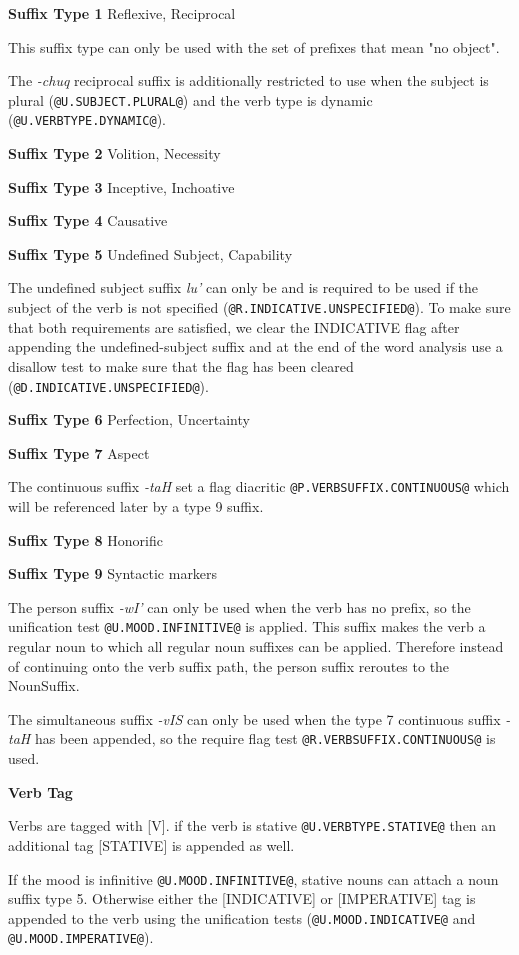 \documentclass[11pt]{article}
\begin{document}
\textbf{Suffix Type 1} Reflexive, Reciprocal
	
This suffix type can only be used with the set of prefixes that mean "no object".

The \textit{-chuq} reciprocal suffix is additionally restricted to use when the subject is plural (\texttt{@U.SUBJECT.PLURAL@}) and the verb type is dynamic (\texttt{@U.VERBTYPE.DYNAMIC@}).

\textbf{Suffix Type 2} Volition, Necessity

\textbf{Suffix Type 3} Inceptive, Inchoative

\textbf{Suffix Type 4} Causative

\textbf{Suffix Type 5} Undefined Subject, Capability

The undefined subject suffix \textit{lu'} can only be and is required to be used if the subject of the verb is not specified (\texttt{@R.INDICATIVE.UNSPECIFIED@}). To make sure that both requirements are satisfied, we clear the INDICATIVE flag after appending the undefined-subject suffix and at the end of the word analysis use a disallow test to make sure that the flag has been cleared (\texttt{@D.INDICATIVE.UNSPECIFIED@}).

\textbf{Suffix Type 6} Perfection, Uncertainty

\textbf{Suffix Type 7} Aspect

The continuous suffix \textit{-taH} set a flag diacritic \texttt{@P.VERBSUFFIX.CONTINUOUS@} which will be referenced later by a type 9 suffix.

\textbf{Suffix Type 8} Honorific

\textbf{Suffix Type 9} Syntactic markers

The person suffix \textit{-wI'} can only be used when the verb has no prefix, so the unification test \texttt{@U.MOOD.INFINITIVE@} is applied. This suffix makes the verb a regular noun to which all regular noun suffixes can be applied. Therefore instead of continuing onto the verb suffix path, the person suffix reroutes to the NounSuffix.

The simultaneous suffix \textit{-vIS} can only be used when the type 7 continuous suffix \textit{-taH} has been appended, so the require flag test \texttt{@R.VERBSUFFIX.CONTINUOUS@} is used.

\textbf{Verb Tag}

Verbs are tagged with [V]. if the verb is stative \texttt{@U.VERBTYPE.STATIVE@} then an additional tag [STATIVE] is appended as well.

If the mood is infinitive \texttt{@U.MOOD.INFINITIVE@}, stative nouns can attach a noun suffix type 5. Otherwise either the [INDICATIVE] or [IMPERATIVE] tag is appended to the verb using the unification tests (\texttt{@U.MOOD.INDICATIVE@} and \texttt{@U.MOOD.IMPERATIVE@}).
\end{document}
